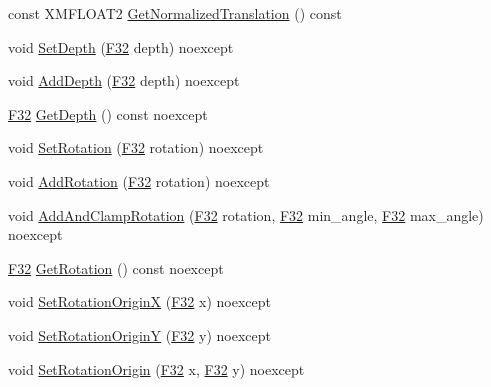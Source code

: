 \begin{DoxyCompactItemize}
\item 
const X\+M\+F\+L\+O\+A\+T2 \hyperlink{structmage_1_1_sprite_transform_a35b4a512d853e08743948f8065d1558f}{Get\+Normalized\+Translation} () const
\item 
void \hyperlink{structmage_1_1_sprite_transform_a99da2aa3c134db3f4a72660befe1ca9a}{Set\+Depth} (\hyperlink{namespacemage_aa97e833b45f06d60a0a9c4fc22ae02c0}{F32} depth) noexcept
\item 
void \hyperlink{structmage_1_1_sprite_transform_a38ba3e38c4397f536e7c1998ef91d3d0}{Add\+Depth} (\hyperlink{namespacemage_aa97e833b45f06d60a0a9c4fc22ae02c0}{F32} depth) noexcept
\item 
\hyperlink{namespacemage_aa97e833b45f06d60a0a9c4fc22ae02c0}{F32} \hyperlink{structmage_1_1_sprite_transform_acbb61149d34be717c43a78fc9113fe9c}{Get\+Depth} () const noexcept
\item 
void \hyperlink{structmage_1_1_sprite_transform_aa5e9162146729dd579e2409e348eafa2}{Set\+Rotation} (\hyperlink{namespacemage_aa97e833b45f06d60a0a9c4fc22ae02c0}{F32} rotation) noexcept
\item 
void \hyperlink{structmage_1_1_sprite_transform_ab189a29372631e74ae5f638243eaa312}{Add\+Rotation} (\hyperlink{namespacemage_aa97e833b45f06d60a0a9c4fc22ae02c0}{F32} rotation) noexcept
\item 
void \hyperlink{structmage_1_1_sprite_transform_a29d41f069bb02f46bae495d1e9a19c9b}{Add\+And\+Clamp\+Rotation} (\hyperlink{namespacemage_aa97e833b45f06d60a0a9c4fc22ae02c0}{F32} rotation, \hyperlink{namespacemage_aa97e833b45f06d60a0a9c4fc22ae02c0}{F32} min\+\_\+angle, \hyperlink{namespacemage_aa97e833b45f06d60a0a9c4fc22ae02c0}{F32} max\+\_\+angle) noexcept
\item 
\hyperlink{namespacemage_aa97e833b45f06d60a0a9c4fc22ae02c0}{F32} \hyperlink{structmage_1_1_sprite_transform_ae7fc2e36ce99ea41a74d53032437dd58}{Get\+Rotation} () const noexcept
\item 
void \hyperlink{structmage_1_1_sprite_transform_a1928602ce38aa2ebf26becd93c875dc5}{Set\+Rotation\+OriginX} (\hyperlink{namespacemage_aa97e833b45f06d60a0a9c4fc22ae02c0}{F32} x) noexcept
\item 
void \hyperlink{structmage_1_1_sprite_transform_a8ccfaf7282419ed636cc97f911472604}{Set\+Rotation\+OriginY} (\hyperlink{namespacemage_aa97e833b45f06d60a0a9c4fc22ae02c0}{F32} y) noexcept
\item 
void \hyperlink{structmage_1_1_sprite_transform_adc5bb1cd5512bea503c981624088a5be}{Set\+Rotation\+Origin} (\hyperlink{namespacemage_aa97e833b45f06d60a0a9c4fc22ae02c0}{F32} x, \hyperlink{namespacemage_aa97e833b45f06d60a0a9c4fc22ae02c0}{F32} y) noexcept

\end{DoxyCompactItemize}
